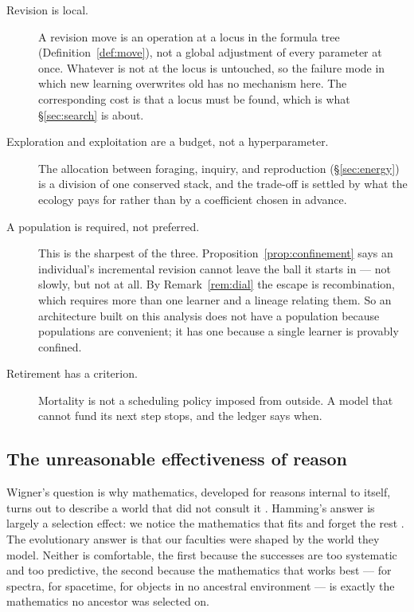 \documentclass[11pt]{article}
\theoremstyle{plain}
\theoremstyle{definition}
\begin{document}
\begin{description}
\item[Revision is local.] A revision move is an operation at a locus in the formula tree
(Definition~\ref{def:move}), not a global adjustment of every parameter at once. Whatever is not at the
locus is untouched, so the failure mode in which new learning overwrites old has no mechanism here.
The corresponding cost is that a locus must be found, which is what \S\ref{sec:search} is about.

\item[Exploration and exploitation are a budget, not a hyperparameter.] The allocation between
foraging, inquiry, and reproduction (\S\ref{sec:energy}) is a division of one conserved stack, and the
trade-off is settled by what the ecology pays for rather than by a coefficient chosen in advance.

\item[A population is required, not preferred.] This is the sharpest of the three.
Proposition~\ref{prop:confinement} says an individual's incremental revision cannot leave the ball it
starts in --- not slowly, but not at all. By Remark~\ref{rem:dial} the escape is recombination, which
requires more than one learner and a lineage relating them. So an architecture built on this analysis
does not have a population because populations are convenient; it has one because a single learner is
provably confined.

\item[Retirement has a criterion.] Mortality is not a scheduling policy imposed from outside. A model
that cannot fund its next step stops, and the ledger says when.
\end{description}

\subsection{The unreasonable effectiveness of reason}

Wigner's question is why mathematics, developed for reasons internal to itself, turns out to describe a
world that did not consult it \cite{Wigner}. Hamming's answer is largely a selection effect: we notice
the mathematics that fits and forget the rest \cite{Hamming}. The evolutionary answer is that our
faculties were shaped by the world they model. Neither is comfortable, the first because the successes
are too systematic and too predictive, the second because the mathematics that works best --- for
spectra, for spacetime, for objects in no ancestral environment --- is exactly the mathematics no
ancestor was selected on.
\end{document}
